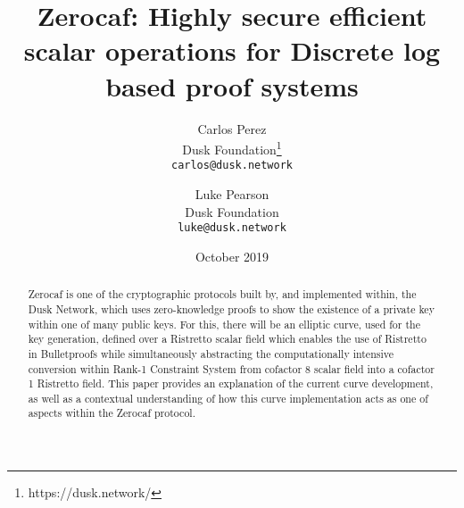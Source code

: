\documentclass{article}
\title{Zerocaf: Highly secure efficient scalar operations for Discrete log based proof systems}
\author{
  Carlos Perez\\
  Dusk Foundation\footnote{https://dusk.network/}\\
  \texttt{carlos@dusk.network}
  \and
  Luke Pearson\\
  Dusk Foundation\\
  \texttt{luke@dusk.network}
}
\date{October 2019}
\begin{document}
\maketitle
\thispagestyle{empty}
\pagestyle{empty}

\begin{abstract}
Zerocaf is one of the cryptographic protocols built by, and implemented within, the Dusk Network, which uses zero-knowledge proofs to show the existence of a private key within one of many public keys. For this, there will be an elliptic curve, used for the key generation, defined over a Ristretto scalar field which enables the use of Ristretto in Bulletproofs while simultaneously abstracting the computationally intensive conversion within Rank-1 Constraint System from cofactor 8 scalar field into a cofactor 1 Ristretto field. This paper provides an explanation of the current curve development, as well as a contextual understanding of how this curve implementation acts as one of aspects within the Zerocaf protocol. 


\end{abstract}

\newpage

\tableofcontents

\newpage
\end{document}
